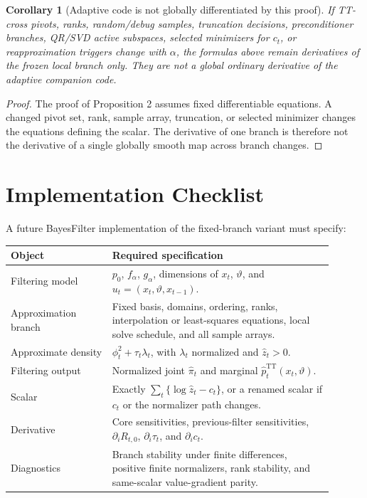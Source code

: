 \documentclass[11pt]{article}
\newcommand{\TT}{\mathrm{TT}}
\newtheorem{corollary}{Corollary}
\theoremstyle{definition}
\theoremstyle{remark}
\begin{document}
\begin{corollary}[Adaptive code is not globally differentiated by this proof]
If TT-cross pivots, ranks, random/debug samples, truncation decisions,
preconditioner branches, QR/SVD active subspaces, selected minimizers for
\(c_t\), or reapproximation triggers change with \(\alpha\), the formulas above
remain derivatives of the frozen local branch only.  They are not a global
ordinary derivative of the adaptive companion code.
\end{corollary}

\begin{proof}
The proof of Proposition 2 assumes fixed differentiable equations.  A changed
pivot set, rank, sample array, truncation, or selected minimizer changes the
equations defining the scalar.  The derivative of one branch is therefore not
the derivative of a single globally smooth map across branch changes.
\end{proof}

\section{Implementation Checklist}

A future BayesFilter implementation of the fixed-branch variant must specify:
\begin{longtable}{@{}p{0.29\linewidth}p{0.61\linewidth}@{}}
\toprule
Object & Required specification \\
\midrule
\endhead
Filtering model & \(p_0\), \(f_\alpha\), \(g_\alpha\), dimensions of
\(x_t\), \(\vartheta\), and \(u_t=(x_t,\vartheta,x_{t-1})\). \\
Approximation branch & Fixed basis, domains, ordering, ranks, interpolation
or least-squares equations, local solve schedule, and all sample arrays. \\
Approximate density & \(\phi_t^2+\tau_t\lambda_t\), with \(\lambda_t\)
normalized and \(\widehat z_t>0\). \\
Filtering output & Normalized joint \(\widehat\pi_t\) and marginal
\(\widehat p_t^{\TT}(x_t,\vartheta)\). \\
Scalar & Exactly \(\sum_t\{\log\widehat z_t-c_t\}\), or a renamed scalar if
\(c_t\) or the normalizer path changes. \\
Derivative & Core sensitivities, previous-filter sensitivities,
\(\partial_iR_{t,0}\), \(\partial_i\tau_t\), and \(\partial_i c_t\). \\
Diagnostics & Branch stability under finite differences, positive finite
normalizers, rank stability, and same-scalar value-gradient parity. \\
\bottomrule
\end{longtable}
\end{document}
